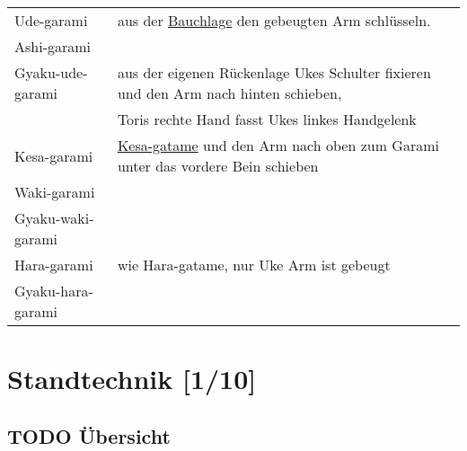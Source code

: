 \documentclass[11pt]{article}
\begin{document}
\begin{enumerate}
\begin{enumerate}
\begin{center}
\begin{tabular}{ll}
\label{org3627c27}Ude-garami & aus der \hyperref[orgf42100a]{Bauchlage} den gebeugten Arm schlüsseln.\\
\label{org42a5426}Ashi-garami & \\
\label{orgf69b104}Gyaku-ude-garami & aus der eigenen Rückenlage Ukes Schulter fixieren und den Arm nach hinten schieben,\\
 & Toris rechte Hand fasst Ukes linkes Handgelenk\\
\label{orgdd7adbe}Kesa-garami & \hyperref[org0fccb72]{Kesa-gatame} und den Arm nach oben zum Garami unter das vordere Bein schieben\\
\label{org1361116}Waki-garami & \\
\label{orgb499e22}Gyaku-waki-garami & \\
\label{orgc740ab9}Hara-garami & wie Hara-gatame, nur Uke Arm ist gebeugt\\
\label{orgcb05beb}Gyaku-hara-garami & \\
\end{tabular}
\end{center}
\end{enumerate}
\end{enumerate}

\section{Standtechnik [1/10]}
\label{sec:org7e4ff60}

\subsection{{\bfseries\sffamily TODO} Übersicht}
\label{sec:org68113e1}
\end{document}
